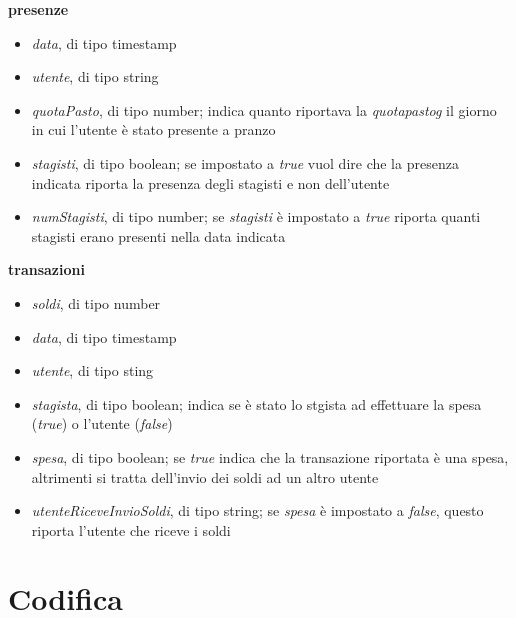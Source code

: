 \textbf{presenze}
\begin{itemize}
    \item \emph{data}, di tipo timestamp
    \item \emph{utente}, di tipo string
    \item \emph{quotaPasto}, di tipo number; indica quanto riportava la \emph{\gls{quotapastog}} il giorno in cui l'utente è stato presente a pranzo
    \item \emph{stagisti}, di tipo boolean; se impostato a \emph{true} vuol dire che la presenza indicata riporta la presenza degli stagisti e non dell'utente
    \item \emph{numStagisti}, di tipo number; se \emph{stagisti} è impostato a \emph{true} riporta quanti stagisti erano presenti nella data indicata
\end{itemize}
\newpage
\textbf{transazioni}
\begin{itemize}
    \item \emph{soldi}, di tipo number
    \item \emph{data}, di tipo timestamp
    \item \emph{utente}, di tipo sting
    \item \emph{stagista}, di tipo boolean; indica se è stato lo stgista ad effettuare la spesa (\emph{true}) o l'utente (\emph{false})
    \item \emph{spesa}, di tipo boolean; se \emph{true} indica che la transazione riportata è una spesa, altrimenti si tratta dell'invio dei soldi ad un altro utente
    \item \emph{utenteRiceveInvioSoldi}, di tipo string; se \emph{spesa} è impostato a \emph{false}, questo riporta l'utente che riceve i soldi
\end{itemize}

\newpage


\section{Codifica} %

